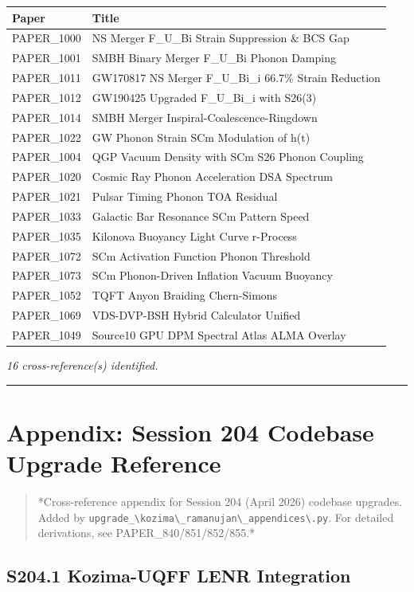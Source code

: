 \documentclass[12pt,a4paper]{article}
\begin{document}
\begin{table}[H]
\centering
\small
\begin{tabularx}{\linewidth}{@{}>{\raggedright\arraybackslash}X>{\raggedright\arraybackslash}X@{}}
\toprule
Paper & Title \tabularnewline
\midrule
PAPER\_1000 & NS Merger F\_{U\_Bi} Strain Suppression \& BCS Gap \tabularnewline
PAPER\_1001 & SMBH Binary Merger F\_{U\_Bi} Phonon Damping \tabularnewline
PAPER\_1011 & GW170817 NS Merger F\_{U\_Bi\_i} 66.7\% Strain Reduction \tabularnewline
PAPER\_1012 & GW190425 Upgraded F\_{U\_Bi\_i} with S26(3) \tabularnewline
PAPER\_1014 & SMBH Merger Inspiral-Coalescence-Ringdown \tabularnewline
PAPER\_1022 & GW Phonon Strain SCm Modulation of h(t) \tabularnewline
PAPER\_1004 & QGP Vacuum Density with SCm S26 Phonon Coupling \tabularnewline
PAPER\_1020 & Cosmic Ray Phonon Acceleration DSA Spectrum \tabularnewline
PAPER\_1021 & Pulsar Timing Phonon TOA Residual \tabularnewline
PAPER\_1033 & Galactic Bar Resonance SCm Pattern Speed \tabularnewline
PAPER\_1035 & Kilonova Buoyancy Light Curve r-Process \tabularnewline
PAPER\_1072 & SCm Activation Function Phonon Threshold \tabularnewline
PAPER\_1073 & SCm Phonon-Driven Inflation Vacuum Buoyancy \tabularnewline
PAPER\_1052 & TQFT Anyon Braiding Chern-Simons \tabularnewline
PAPER\_1069 & VDS-DVP-BSH Hybrid Calculator Unified \tabularnewline
PAPER\_1049 & Source10 GPU DPM Spectral Atlas ALMA Overlay \tabularnewline
\bottomrule
\end{tabularx}
\end{table}

\emph{16 cross-reference(s) identified.}

\medskip\hrule\medskip

\section{Appendix: Session 204 Codebase Upgrade Reference}

\begin{quote}
*Cross-reference appendix for Session 204 (April 2026) codebase upgrades.
Added by \texttt{upgrade\_\textbackslash {kozima\textbackslash \_ramanujan\textbackslash \_appendices\textbackslash }.py}. For detailed derivations,
see PAPER\_840/851/852/855.*
\end{quote}

\subsection{S204.1 Kozima-UQFF LENR Integration}
\end{document}
